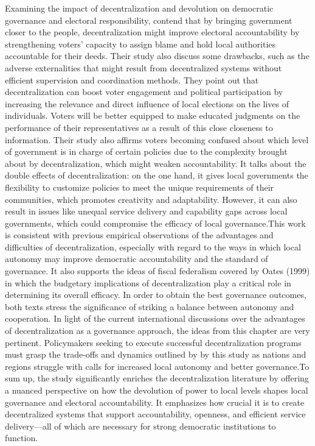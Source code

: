 Examining the impact of decentralization and devolution on democratic governance and electoral responsibility,  contend that by bringing government closer to the people, decentralization might improve electoral accountability by strengthening voters' capacity to assign blame and hold local authorities accountable for their deeds. Their study also discuss some drawbacks, such as the adverse externalities that might result from decentralized systems without efficient supervision and coordination methods. They point out that decentralization can boost voter engagement and political participation by increasing the relevance and direct influence of local elections on the lives of individuals. Voters will be better equipped to make educated judgments on the performance of their representatives as a result of this close closeness to information. Their study also affirms voters becoming confused about which level of government is in charge of certain policies due to the complexity brought about by decentralization, which might weaken accountability. It talks about the double effects of decentralization: on the one hand, it gives local governments the flexibility to customize policies to meet the unique requirements of their communities, which promotes creativity and adaptability. However, it can also result in issues like unequal service delivery and capability gaps across local governments, which could compromise the efficacy of local governance.This work is consistent with previous empirical observations of the advantages and difficulties of decentralization, especially with regard to the ways in which local autonomy may improve democratic accountability and the standard of governance. It also supports the ideas of fiscal federalism covered by Oates (1999) in which the budgetary implications of decentralization play a critical role in determining its overall efficacy. In order to obtain the best governance outcomes, both texts stress the significance of striking a balance between autonomy and cooperation. In light of the current international discussions over the advantages of decentralization as a governance approach, the ideas from this chapter are very pertinent. Policymakers seeking to execute successful decentralization programs must grasp the trade-offs and dynamics outlined by by this study as nations and regions struggle with calls for increased local autonomy and better governance.To sum up, the study significantly enriches the decentralization literature by offering a nuanced perspective on how the devolution of power to local levels shapes local governance and electoral accountability. It emphasizes how crucial it is to create decentralized systems that support accountability, openness, and efficient service delivery—all of which are necessary for strong democratic institutions to function.\\
\vspace{-9mm} 

